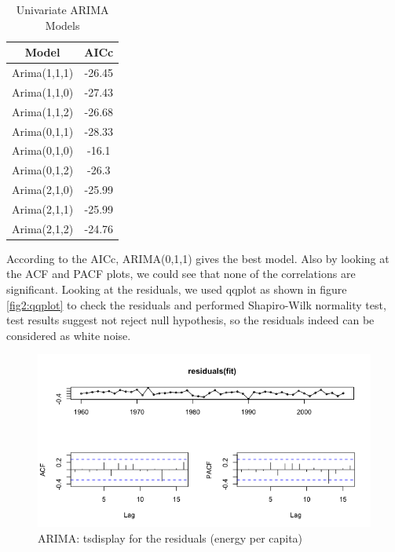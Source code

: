 \documentclass[journal, a4paper]{IEEEtran}
\begin{document}
\begin{table}[H]
\caption{Univariate ARIMA Models}
\label{table:univariate_arima}
\centering
\begin{tabular}{|c|c|}
\hline
Model & AICc \\ \hline
Arima(1,1,1) &  -26.45  \\ 
Arima(1,1,0) &   -27.43 \\  
Arima(1,1,2) &  -26.68  \\ 
Arima(0,1,1) &   -28.33 \\ 
Arima(0,1,0) &   -16.1 \\ 
Arima(0,1,2) &   -26.3  \\ 
Arima(2,1,0) &    -25.99 \\ 
Arima(2,1,1) &   -25.99 \\ 
Arima(2,1,2) &    -24.76\\
\hline
\end{tabular}
\end{table}



According to the AICc, ARIMA(0,1,1) gives the best model. Also by looking at the ACF and PACF plots, we could see that none of the correlations are significant. Looking at the residuals, we used qqplot as shown in figure \ref{fig2:qqplot} to check the residuals and performed Shapiro-Wilk normality test, test results suggest not reject null hypothesis, so the residuals indeed can be considered as white noise.

\begin{figure}[H]
\begin{center}
\includegraphics[scale=0.5]{fig2/univariate_residuals.png}
\caption{ARIMA: tsdisplay for the residuals (energy per capita)}
\label{fig2:residuals_univariate}
\end{center}
\end{figure}
\end{document}
